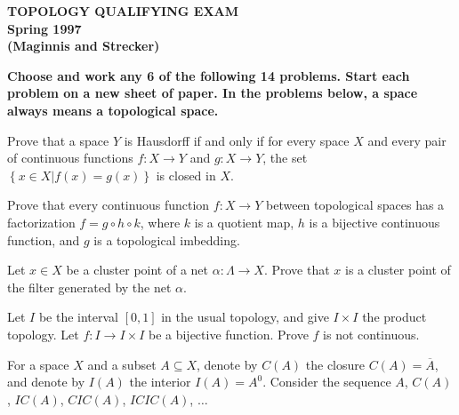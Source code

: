 \documentclass[bbb]{report}
\begin{document}
\pagestyle{empty}

\begin{Large}
\begin{center}
{\bf   TOPOLOGY QUALIFYING EXAM \\
   Spring 1997 \\
   (Maginnis and Strecker)} \\
\end{center}
\end{Large}

\begin{large}

\vspace{.1in}
{\bf Choose and work any 6 of the following 14 problems. Start
each problem on a new sheet of paper.  In the problems below, a space always
means a topological space.}

\vspace{.5in}

\begin{description}
{\bf
\item[1.]  Prove that a space $Y$ is Hausdorff if and only if for
every space $X$ and every pair of continuous functions $f:X\to Y$
and $g:X\to Y$, the set $\left\{x\in X|f(x)=g(x)\right\}$ is
closed in $X$.

\vspace{.5in}

\item[2.] Prove that every continuous function $f:X\to Y$ between
topological spaces has a factorization $f=g\circ h\circ k$, where
$k$ is a quotient map, $h$ is a bijective continuous function,
and $g$ is a topological imbedding.

\vspace{.5in}

\item[3.] Let $x\in X$ be a cluster point of a net
$\alpha:\Lambda\to X$. Prove that $x$ is a cluster point of the
filter generated by the net $\alpha$.

\vspace{.5in}

\item[4.] Let $I$ be the interval $[0,1]$ in the usual topology,
and give $I\times I$ the product topology. Let $f:I\to I\times I$
be a bijective function. Prove $f$ is not continuous.

\vspace{.5in}

\item[5.] For a space $X$ and a subset $A\subseteq X$, denote by
$C(A)$ the closure $C(A)=\overline A$, and denote by $I(A)$ the
interior $I(A)=A^0$. Consider the sequence $A$, $C(A)$, $IC(A)$,
$CIC(A)$, $ICIC(A)$, $\dots$

}
\end{description}
\end{large}
\end{document}
